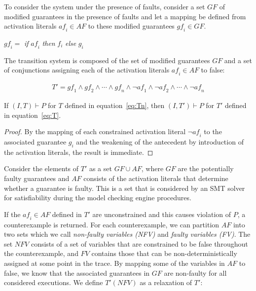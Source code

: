 
To consider the system under the presence of faults, consider a set $GF$ of modified guarantees in the presence of faults and let a mapping be defined from activation literals $\mathit{af}_i \in AF$ to these modified guarantees $\mathit{gf}_i \in GF$. 
\begin{center}
$\mathit{gf}_i =$ \textit{if} $\mathit{af}_i$ \textit{then} $f_i$ \textit{else} $g_i$
\label{eq:sigma}
\end{center}

The transition system is composed of the set of modified guarantees $GF$ and a set of conjunctions assigning each of the activation literals $\mathit{af}_i \in AF$ to false: 

\begin{gather}
T' = \mathit{gf}_1 \land \mathit{gf}_2 \land \cdots \land \mathit{gf}_n \land \neg \mathit{af}_1 \land \neg \mathit{af}_2 \land \cdots \land \neg \mathit{af}_n
\label{eq:T}
\end{gather}

\begin{theorem} If $(I,T) \vdash P$ for $T$ defined in equation~\ref{eq:Tn}, then $(I,T') \vdash P$ for $T'$ defined in equation~\ref{eq:T}.
\begin{proof}
By the mapping of each constrained activation literal $\neg \mathit{af}_i$ to the associated guarantee $g_i$ and the weakening of the antecedent by introduction of the activation literals, the result is immediate.
\end{proof}
\end{theorem}

Consider the elements of $T'$ as a set $GF \cup AF$, where $GF$ are the potentially faulty guarantees and $AF$ consists of the activation literals that determine whether a guarantee is faulty. This is a set that is considered by an SMT solver for satisfiability during the model checking engine procedures. 

If the $\mathit{af}_i \in \mathit{AF}$ defined in $T'$ are unconstrained and this causes violation of $P$, a counterexample is returned. For each counterexample, we can partition $\mathit{AF}$ into two sets which we call {\em non-faulty variables (NFV)} and {\em faulty variables (FV)}.  The set $\mathit{NFV}$ consists of a set of variables that are constrained to be false throughout the counterexample, and $\mathit{FV}$ contains those that can be non-deterministically assigned at some point in the trace. By mapping some of the variables in $\mathit{AF}$ to false, we know that the associated guarantees in $\mathit{GF}$ are non-faulty for all considered executions. We define $T'(\mathit{NFV})$ as a relaxation of $T'$:

